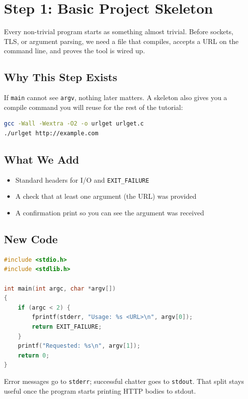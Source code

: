 \section{Step 1: Basic Project Skeleton}

Every non-trivial program starts as something almost trivial. Before sockets,
TLS, or argument parsing, we need a file that compiles, accepts a URL on the
command line, and proves the tool is wired up.

\subsection{Why This Step Exists}

If \texttt{main} cannot see \texttt{argv}, nothing later matters. A skeleton
also gives you a compile command you will reuse for the rest of the tutorial:

\begin{lstlisting}[style=snippet,language=bash]
gcc -Wall -Wextra -O2 -o urlget urlget.c
./urlget http://example.com
\end{lstlisting}

\subsection{What We Add}

\begin{itemize}[leftmargin=1.4em]
    \item Standard headers for I/O and \texttt{EXIT\_FAILURE}
    \item A check that at least one argument (the URL) was provided
    \item A confirmation print so you can see the argument was received
\end{itemize}

\subsection{New Code}

\begin{lstlisting}[style=snippet,language=C]
#include <stdio.h>
#include <stdlib.h>

int main(int argc, char *argv[])
{
    if (argc < 2) {
        fprintf(stderr, "Usage: %s <URL>\n", argv[0]);
        return EXIT_FAILURE;
    }
    printf("Requested: %s\n", argv[1]);
    return 0;
}
\end{lstlisting}

Error messages go to \texttt{stderr}; successful chatter goes to
\texttt{stdout}. That split stays useful once the program starts printing
HTTP bodies to stdout.

